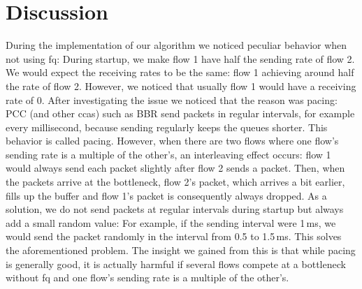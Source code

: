 \documentclass[runningheads]{llncs}
\begin{document}

\section{Discussion}

During the implementation of our algorithm we noticed peculiar behavior when not using \gls{fq}: During startup, we make flow 1 have half the sending rate of flow 2. We would expect the receiving rates to be the same: flow 1 achieving around half the rate of flow 2. However, we noticed that usually flow 1 would have a receiving rate of 0. After investigating the issue we noticed that the reason was pacing: PCC (and other \glspl{cca}) such as BBR send packets in regular intervals, for example every millisecond, because sending regularly keeps the queues shorter. This behavior is called pacing. However, when there are two flows where one flow's sending rate is a multiple of the other's, an interleaving effect occurs: flow 1 would always send each packet slightly after flow 2 sends a packet. Then, when the packets arrive at the bottleneck, flow 2's packet, which arrives a bit earlier, fills up the buffer and flow 1's packet is consequently always dropped. As a solution, we do not send packets at regular intervals during startup but always add a small random value: For example, if the sending interval were 1\,ms, we would send the packet randomly in the interval from 0.5 to 1.5\,ms. This solves the aforementioned problem. The insight we gained from this is that while pacing is generally good, it is actually harmful if several flows compete at a bottleneck without \gls{fq} and one flow's sending rate is a multiple of the other's.
\end{document}
